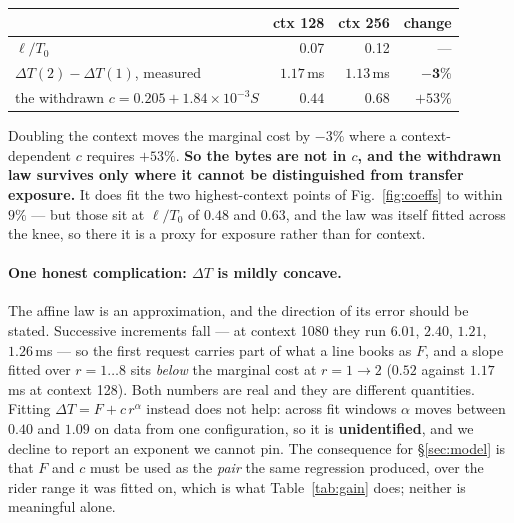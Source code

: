 \begin{center}\small
\begin{tabular}{lrrr}
\toprule
 & ctx 128 & ctx 256 & change \\
\midrule
$\ell/T_0$ & 0.07 & 0.12 & --- \\
$\Delta T(2) - \Delta T(1)$, measured & $1.17$\,ms & $1.13$\,ms & $\mathbf{-3\%}$ \\
the withdrawn $c = 0.205 + 1.84{\times}10^{-3}S$ & $0.44$ & $0.68$ & $+53\%$ \\
\bottomrule
\end{tabular}
\end{center}

Doubling the context moves the marginal cost by $-3\%$ where a context-dependent
$c$ requires $+53\%$. \textbf{So the bytes are not in $c$, and the withdrawn law
survives only where it cannot be distinguished from transfer exposure.} It does fit
the two highest-context points of Fig.~\ref{fig:coeffs} to within $9\%$ --- but
those sit at $\ell/T_0$ of $0.48$ and $0.63$, and the law was itself fitted across
the knee, so there it is a proxy for exposure rather than for context.

\paragraph{One honest complication: $\Delta T$ is mildly concave.}
The affine law is an approximation, and the direction of its error should be stated.
Successive increments fall --- at context 1080 they run $6.01$, $2.40$, $1.21$,
$1.26$\,ms --- so the first request carries part of what a line books as $F$, and a
slope fitted over $r = 1\ldots8$ sits \emph{below} the marginal cost at
$r = 1 \to 2$ ($0.52$ against $1.17$\,ms at context 128). Both numbers are real and
they are different quantities. Fitting $\Delta T = F + c\,r^{\alpha}$ instead does
not help: across fit windows $\alpha$ moves between $0.40$ and $1.09$ on data from
one configuration, so it is \textbf{unidentified}, and we decline to report an
exponent we cannot pin. The consequence for \S\ref{sec:model} is that $F$ and $c$
must be used as the \emph{pair} the same regression produced, over the rider range
it was fitted on, which is what Table~\ref{tab:gain} does; neither is meaningful
alone.

